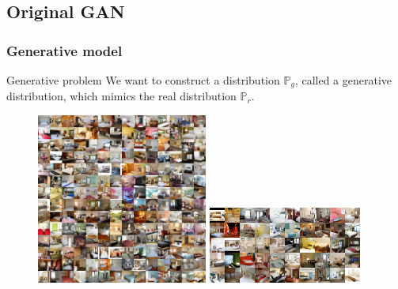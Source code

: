 \documentclass[french,9pt]{beamer}
\begin{document}
\subsection{Original GAN \cite{googfellow2014}}

\begin{frame}
\frametitle{Generative model}

\begin{block}{Generative problem}
We want to construct a distribution $\mathbb{P}_{g}$, called a generative distribution, which mimics the real distribution $\mathbb{P}_{r}$.
\end{block}

\begin{figure}
  \begin{center}
    \includegraphics[width=0.5\textwidth]{fig/lsun_bedrooms_real.png}\hspace{1mm}
     \includegraphics[width=0.45\textwidth]{fig/lsun_bedrooms_five_epoch_samples.png}\hspace{1mm}
  \end{center}
  \caption{\cite{2015arXiv151106434R}}
\end{figure}

\end{frame}
\end{document}
